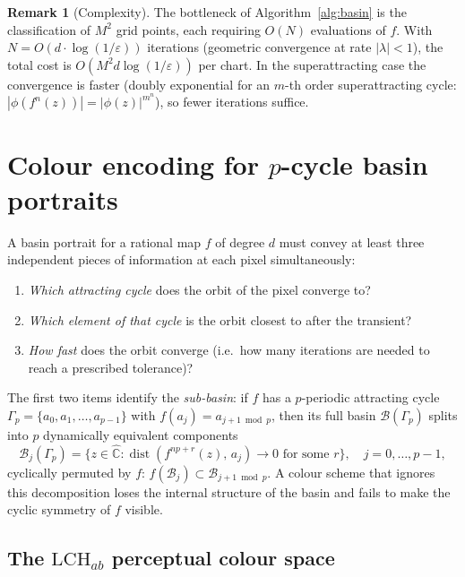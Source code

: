 \documentclass[12pt]{article}
\theoremstyle{definition}
\newtheorem{remark}[theorem]{Remark}
\begin{document}
\begin{remark}[Complexity]
The bottleneck of Algorithm~\ref{alg:basin} is the classification of
$M^2$ grid points, each requiring $O(N)$ evaluations of $f$.  With
$N=O(d\cdot\log(1/\varepsilon))$ iterations (geometric convergence at
rate $|\lambda|<1$), the total cost is $O(M^2 d\log(1/\varepsilon))$
per chart.  In the superattracting case the convergence is faster
(doubly exponential for an $m$-th order superattracting cycle:
$|\phi(f^n(z))| = |\phi(z)|^{m^n}$), so fewer iterations suffice.
\end{remark}


\section{Colour encoding for $p$-cycle basin portraits}
\label{sec:colour}

A basin portrait for a rational map $f$ of degree $d$ must convey at least
three independent pieces of information at each pixel simultaneously:
\begin{enumerate}
  \item \emph{Which attracting cycle} does the orbit of the pixel converge to?
  \item \emph{Which element of that cycle} is the orbit closest to after the
        transient?
  \item \emph{How fast} does the orbit converge (i.e.\ how many iterations are
        needed to reach a prescribed tolerance)?
\end{enumerate}
The first two items identify the \emph{sub-basin}: if $f$ has a $p$-periodic
attracting cycle $\Gamma_p=\{a_0,a_1,\ldots,a_{p-1}\}$ with $f(a_j)=a_{j+1\bmod p}$,
then its full basin $\mathcal{B}(\Gamma_p)$ splits into $p$ dynamically equivalent
components
\[
  \mathcal{B}_j(\Gamma_p)
    = \bigl\{z\in\hat{\mathbb{C}} :
        \operatorname{dist}(f^{np+r}(z),\,a_j)\to 0 \text{ for some } r\bigr\},
  \quad j=0,\ldots,p-1,
\]
cyclically permuted by $f$: $f(\mathcal{B}_j)\subset\mathcal{B}_{j+1\bmod p}$.
A colour scheme that ignores this decomposition loses the internal structure of
the basin and fails to make the cyclic symmetry of $f$ visible.

\subsection{The \texorpdfstring{$\mathrm{LCH}_{ab}$}{LCHab} perceptual colour space}
\end{document}
